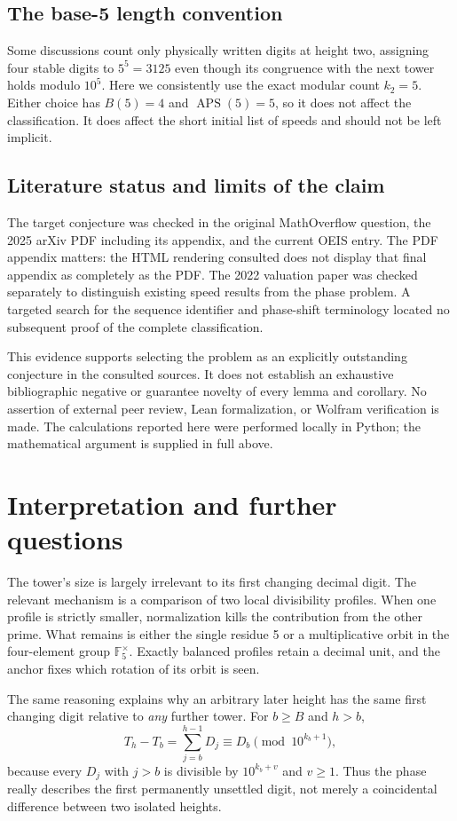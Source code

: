 \documentclass[11pt,letterpaper]{article}
\numberwithin{equation}{section}
\theoremstyle{definition}
\newcommand{\F}{\mathbb F}
\newcommand{\APS}{\operatorname{APS}}
\begin{document}
\subsection{The base-5 length convention}
Some discussions count only physically written digits at height two, assigning
four stable digits to $5^5=3125$ even though its congruence with the next tower
holds modulo $10^5$. Here we consistently use the exact modular count
$k_2=5$. Either choice has $B(5)=4$ and $\APS(5)=5$, so it does not affect the
classification. It does affect the short initial list of speeds and should
not be left implicit.

\subsection{Literature status and limits of the claim}
The target conjecture was checked in the original MathOverflow question, the
2025 arXiv PDF including its appendix, and the current OEIS entry. The PDF
appendix matters: the HTML rendering consulted does not display that final
appendix as completely as the PDF. The 2022 valuation paper was checked
separately to distinguish existing speed results from the phase problem.
A targeted search for the sequence identifier and phase-shift terminology
located no subsequent proof of the complete classification.

This evidence supports selecting the problem as an explicitly outstanding
conjecture in the consulted sources. It does not establish an exhaustive
bibliographic negative or guarantee novelty of every lemma and corollary.
No assertion of external peer review, Lean formalization, or Wolfram
verification is made. The calculations reported here were performed locally
in Python; the mathematical argument is supplied in full above.

\section{Interpretation and further questions}
The tower's size is largely irrelevant to its first changing decimal digit.
The relevant mechanism is a comparison of two local divisibility profiles.
When one profile is strictly smaller, normalization kills the contribution
from the other prime. What remains is either the single residue 5 or a
multiplicative orbit in the four-element group $\F_5^\times$. Exactly balanced
profiles retain a decimal unit, and the anchor fixes which rotation of its
orbit is seen.

The same reasoning explains why an arbitrary later height has the same first
changing digit relative to \emph{any} further tower. For $b\geq B$ and $h>b$,
\[
 T_h-T_b=\sum_{j=b}^{h-1}D_j\equiv D_b\pmod {10^{k_b+1}},
\]
because every $D_j$ with $j>b$ is divisible by $10^{k_b+v}$ and $v\geq1$.
Thus the phase really describes the first permanently unsettled digit, not
merely a coincidental difference between two isolated heights.
\end{document}
